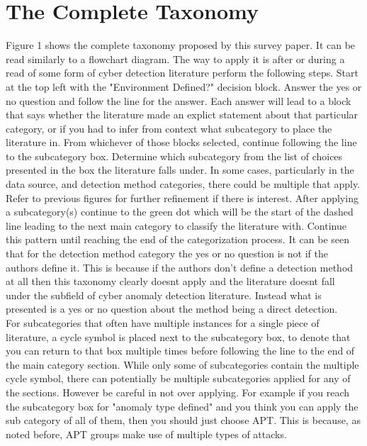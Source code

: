 \documentclass[10pt]{IEEEtran}
\begin{document}
\section{The Complete Taxonomy}
Figure 1 shows the complete taxonomy proposed by this survey paper. It can be read similarly to a flowchart diagram. The way to apply it is after or during a read of some form of cyber detection literature perform the following steps. Start at the top left with the "Environment Defined?" decision block. Answer the yes or no question and follow the line for the answer. Each answer will lead to a block that says whether the literature made an explict statement about that particular category, or if you had to infer from context what subcategory to place the literature in. From whichever of those blocks selected, continue following the line to the subcategory box. Determine which subcategory from the list of choices presented in the box the literature falls under. In some cases, particularly in the data source, and detection method categories, there could be multiple that apply. Refer to previous figures for further refinement if there is interest. After applying a subcategory(s) continue to the green dot which will be the start of the dashed line leading to the next main category to classify the literature with. Continue this pattern until reaching the end of the categorization process. It can be seen that for the detection method category the yes or no question is not if the authors define it. This is because if the authors don't define a detection method at all then this taxonomy clearly doesnt apply and the literature doesnt fall under the subfield of cyber anomaly detection literature. Instead what is presented is a yes or no question about the method being a direct detection.\\
For subcategories that often have multiple instances for a single piece of literature, a cycle symbol is placed next to the subcategory box, to denote that you can return to that box multiple times before following the line to the end of the main category section. While only some of subcategories contain the multiple cycle symbol, there can potentially be multiple subcategories applied for any of the sections. However be careful in not over applying. For example if you reach the subcategory box for "anomaly type defined" and you think you can apply the sub category of all of them, then you should just choose APT. This is because, as noted before, APT groups make use of multiple types of attacks.
\end{document}
